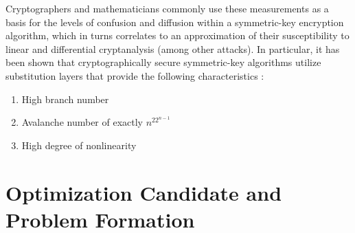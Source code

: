 \documentclass[11pt]{article}
\begin{document}
Cryptographers and mathematicians commonly use these measurements as a basis for the levels of confusion and diffusion within a symmetric-key encryption algorithm, which in turns correlates to an approximation of their susceptibility to linear and differential cryptanalysis (among other attacks). In particular, it has been shown that cryptographically secure symmetric-key algorithms utilize substitution layers that provide the following characteristics \cite{Kim90astudy}:
\begin{enumerate}
	\item High branch number
	\item Avalanche number of exactly $n^22^{n-1}$
	\item High degree of nonlinearity
\end{enumerate}

\section{Optimization Candidate and Problem Formation}
\end{document}
